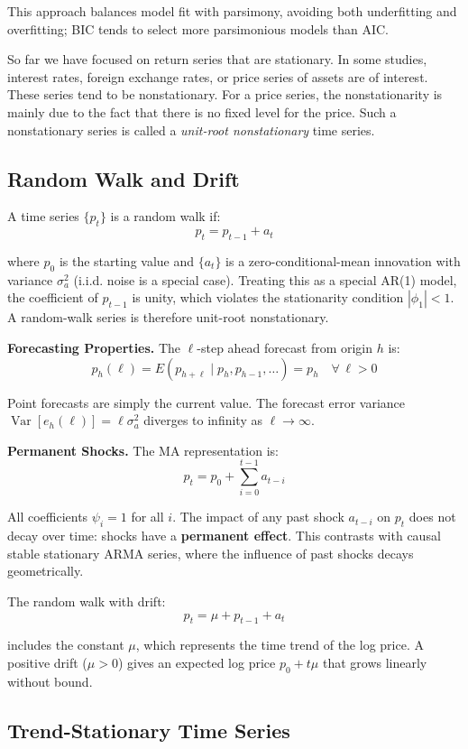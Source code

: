 This approach balances model fit with parsimony, avoiding both underfitting and overfitting; BIC tends to select more parsimonious models than AIC.

So far we have focused on return series that are stationary. In some studies, interest rates, foreign exchange rates, or price series of assets are of interest. These series tend to be nonstationary. For a price series, the nonstationarity is mainly due to the fact that there is no fixed level for the price. Such a nonstationary series is called a \textit{unit-root nonstationary} time series.
\subsection{Random Walk and Drift}

A time series $\{p_t\}$ is a random walk if:
$$p_t = p_{t-1} + a_t$$

where $p_0$ is the starting value and $\{a_t\}$ is a zero-conditional-mean innovation with variance $\sigma_a^2$ (i.i.d. noise is a special case). Treating this as a special AR(1) model, the coefficient of $p_{t-1}$ is unity, which violates the stationarity condition $|\phi_1| < 1$. A random-walk series is therefore unit-root nonstationary.

\textbf{Forecasting Properties.} The $\ell$-step ahead forecast from origin $h$ is:
$$\hat{p}_h(\ell) = E(p_{h+\ell} \mid p_h, p_{h-1}, \ldots) = p_h \quad \forall\, \ell > 0$$

Point forecasts are simply the current value. The forecast error variance $\operatorname{Var}[e_h(\ell)] = \ell\sigma_a^2$ diverges to infinity as $\ell \to \infty$.

\textbf{Permanent Shocks.} The MA representation is:
$$p_t = p_0+\sum_{i=0}^{t-1} a_{t-i}$$

All coefficients $\psi_i = 1$ for all $i$. The impact of any past shock $a_{t-i}$ on $p_t$ does not decay over time: shocks have a \textbf{permanent effect}. This contrasts with causal stable stationary ARMA series, where the influence of past shocks decays geometrically.

The random walk with drift:
$$p_t = \mu + p_{t-1} + a_t$$

includes the constant $\mu$, which represents the time trend of the log price. A positive drift ($\mu > 0$) gives an expected log price $p_0+t\mu$ that grows linearly without bound.
\subsection{Trend-Stationary Time Series}

